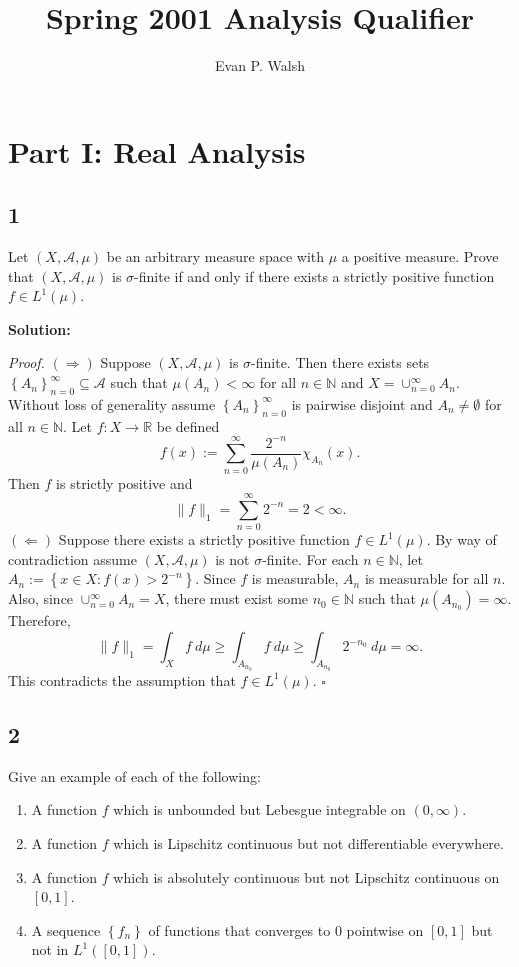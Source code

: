 \documentclass[12pt]{article}
\title{Spring 2001 Analysis Qualifier}
\author{Evan P. Walsh}
\newcounter{ProofCounter}
\newenvironment{Proof}{\stepcounter{ProofCounter}\textit{Proof.}}{\hfill$\square$}
\begin{document}

\section*{Part I: Real Analysis}

\subsection*{1}
Let $(X, \mathcal{A}, \mu)$ be an arbitrary measure space with $\mu$ a positive measure. Prove that $(X, \mathcal{A}, \mu)$ is $\sigma$-finite if and
only if there exists a strictly positive function $f \in L^{1}(\mu)$.

{\bf Solution:}

\begin{Proof}
$(\Rightarrow)$ Suppose $(X, \mathcal{A}, \mu)$ is $\sigma$-finite. Then there exists sets $\left\{ A_{n} \right\}_{n=0}^{\infty} \subseteq
\mathcal{A}$ such that $\mu(A_{n}) < \infty$ for all $n \in \mathbb{N}$ and $X = \cup_{n=0}^{\infty}A_{n}$. Without loss of generality assume 
$\left\{ A_{n} \right\}_{n=0}^{\infty}$ is pairwise disjoint and $A_{n} \neq \emptyset$ for all $n \in \mathbb{N}$. Let $f : X \rightarrow \mathbb{R}$
be defined 
\[ f(x) := \sum_{n=0}^{\infty}\frac{2^{-n}}{\mu(A_{n})}\chi_{A_{n}}(x). \] 
Then $f$ is strictly positive and 
\[ \|f\|_{1} = \sum_{n=0}^{\infty}2^{-n} = 2 < \infty. \]
$(\Leftarrow)$ Suppose there exists a strictly positive function $f \in L^{1}(\mu)$. By way of contradiction assume $(X, \mathcal{A}, \mu)$ is not
$\sigma$-finite. For each $n \in \mathbb{N}$, let $A_{n} := \left\{ x \in X : f(x) > 2^{-n} \right\}$. Since $f$ is measurable, $A_{n}$ is measurable
for all $n$. Also, since $\cup_{n=0}^{\infty}A_{n} = X$, there must exist some $n_{0} \in \mathbb{N}$ such that $\mu(A_{n_{0}}) = \infty$. Therefore,
\[ \|f\|_{1} = \int_{X} f\ d\mu \geq \int_{A_{n_{0}}}f \ d\mu \geq \int_{A_{n_{0}}} 2^{-n_{0}} \ d\mu = \infty. \]
This contradicts the assumption that $f \in L^{1}(\mu)$.
\end{Proof}

\newpage
\subsection*{2}
Give an example of each of the following:
\begin{enumerate}[label=(\alph*)]
\item A function $f$ which is unbounded but Lebesgue integrable on $(0,\infty)$.
\item A function $f$ which is Lipschitz continuous but not differentiable everywhere.
\item A function $f$ which is absolutely continuous but not Lipschitz continuous on $[0,1]$.
\item A sequence $\left\{ f_{n} \right\}$ of functions that converges to $0$ pointwise on $[0,1]$ but not in $L^{1}([0,1])$.
\end{enumerate}
\end{document}
